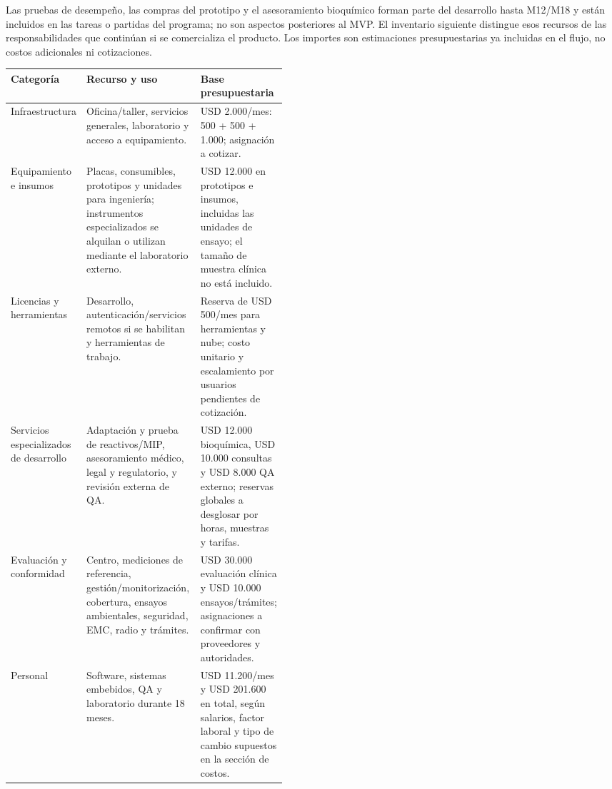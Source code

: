 Las pruebas de desempeño, las compras del prototipo y el asesoramiento bioquímico forman parte del desarrollo hasta M12/M18 y están incluidos en las tareas o partidas del programa; no son aspectos posteriores al MVP. El inventario siguiente distingue esos recursos de las responsabilidades que continúan si se comercializa el producto. Los importes son estimaciones presupuestarias ya incluidas en el flujo, no costos adicionales ni cotizaciones.

{\small
\renewcommand{\arraystretch}{1.15}
\begin{tabularx}{\linewidth}{|>{\raggedright\arraybackslash}p{0.20\linewidth}|>{\raggedright\arraybackslash}X|>{\raggedright\arraybackslash}p{0.25\linewidth}|}
\hline
\textbf{Categoría} & \textbf{Recurso y uso} & \textbf{Base presupuestaria}\\\hline
Infraestructura & Oficina/taller, servicios generales, laboratorio y acceso a equipamiento. & USD 2.000/mes: 500 + 500 + 1.000; asignación a cotizar.\\\hline
Equipamiento e insumos & Placas, consumibles, prototipos y unidades para ingeniería; instrumentos especializados se alquilan o utilizan mediante el laboratorio externo. & USD 12.000 en prototipos e insumos, incluidas las unidades de ensayo; el tamaño de muestra clínica no está incluido.\\\hline
Licencias y herramientas & Desarrollo, autenticación/servicios remotos si se habilitan y herramientas de trabajo. & Reserva de USD 500/mes para herramientas y nube; costo unitario y escalamiento por usuarios pendientes de cotización.\\\hline
Servicios especializados de desarrollo & Adaptación y prueba de reactivos/MIP, asesoramiento médico, legal y regulatorio, y revisión externa de QA. & USD 12.000 bioquímica, USD 10.000 consultas y USD 8.000 QA externo; reservas globales a desglosar por horas, muestras y tarifas.\\\hline
Evaluación y conformidad & Centro, mediciones de referencia, gestión/monitorización, cobertura, ensayos ambientales, seguridad, EMC, radio y trámites. & USD 30.000 evaluación clínica y USD 10.000 ensayos/trámites; asignaciones a confirmar con proveedores y autoridades.\\\hline
Personal & Software, sistemas embebidos, QA y laboratorio durante 18 meses. & USD 11.200/mes y USD 201.600 en total, según salarios, factor laboral y tipo de cambio supuestos en la sección de costos.\\\hline
\end{tabularx}}

